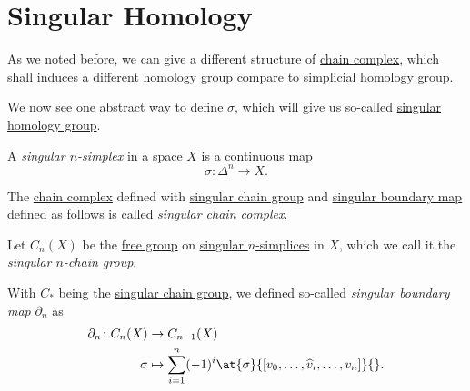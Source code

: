 \section{Singular Homology}
As we noted before, we can give a different structure of \hyperref[def:chain-complex]{chain complex}, which shall
induces a different \hyperref[def:homology-group]{homology group} compare to \hyperref[def:simplicial-homology-group]{simplicial homology group}.

We now see one abstract way to define \(\sigma \), which will give us so-called \hyperref[def:singular-homology-group]{singular homology group}.

\begin{definition}\label{def:singular-simplex}
	A \emph{singular \(n\)-simplex} in a space \(X\) is a continuous map
	\[
		\sigma \colon \Delta^n \to X.
	\]
\end{definition}

\begin{definition}\label{def:singular-chain-complex}
	The \hyperref[def:chain-complex]{chain complex} defined with \hyperref[def:singular-chain-group]{singular chain group} and
	\hyperref[def:singular-boundary-map]{singular boundary map} defined as follows is called \emph{singular chain complex}.
	\begin{definition}\label{def:singular-chain-group}
		Let \(C_n(X)\) be the \hyperref[def:free-group]{free group} on \hyperref[def:singular-simplex]{singular \(n\)-simplices} in \(X\), which we
		call it the \emph{singular \(n\)-chain group}.
	\end{definition}
	\begin{definition}\label{def:singular-boundary-map}
		With \(C_\ast\) being the \hyperref[def:singular-chain-group]{singular chain group}, we defined so-called \emph{singular boundary map} \(\partial _n\) as
		\[
			\begin{split}
				\partial_n \colon C_n(X) & \to C_{n - 1}(X)                                                                       \\
				\sigma              & \mapsto \sum_{i = 1}^n (-1)^i \at{\sigma}{[v_0, \dots, \widehat{v}_i, \dots, v_n]}{}.
			\end{split}
		\]
	\end{definition}
\end{definition}


